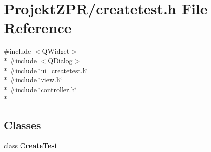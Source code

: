 \section{Projekt\-Z\-P\-R/createtest.h File Reference}
\label{createtest_8h}
{\ttfamily \#include $<$Q\-Widget$>$}\\*
{\ttfamily \#include $<$Q\-Dialog$>$}\\*
{\ttfamily \#include \char`\"{}ui\-\_\-createtest.\-h\char`\"{}}\\*
{\ttfamily \#include \char`\"{}view.\-h\char`\"{}}\\*
{\ttfamily \#include \char`\"{}controller.\-h\char`\"{}}\\*
\subsection*{Classes}
\begin{DoxyCompactItemize}
\item 
class {\bf Create\-Test}
\end{DoxyCompactItemize}
